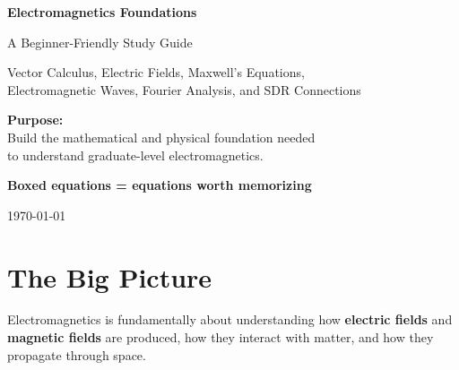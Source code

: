 \documentclass[11pt]{article}
\begin{document}

\begin{titlepage}
    \centering

    \vspace*{2cm}

    {\Huge\bfseries Electromagnetics Foundations\par}

    \vspace{0.5cm}

    {\Large A Beginner-Friendly Study Guide\par}

    \vspace{1.5cm}

    {\large
    Vector Calculus, Electric Fields, Maxwell's Equations,\\
    Electromagnetic Waves, Fourier Analysis, and SDR Connections
    \par}

    \vfill

    {\large
    \textbf{Purpose:}\\
    Build the mathematical and physical foundation needed\\
    to understand graduate-level electromagnetics.
    \par}

    \vspace{1cm}

    {\large
    \textbf{Boxed equations = equations worth memorizing}
    \par}

    \vfill

    {\large
    \today
    \par}

\end{titlepage}

\tableofcontents
\newpage



\section{The Big Picture}

Electromagnetics is fundamentally about understanding how
\textbf{electric fields} and \textbf{magnetic fields} are produced,
how they interact with matter, and how they propagate through space.
\end{document}
